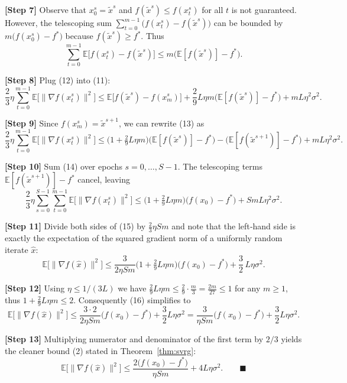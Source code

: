 \documentclass{article}
\begin{document}
\noindent\textbf{[Step 7]} Observe that $x_{0}^{s}=\tilde{x}^{s}$ and $f(\tilde{x}^{s})\le f(x_{t}^{s})$ for all $t$ is not guaranteed. However, the telescoping sum $\sum_{t=0}^{m-1}\big(f(x_{t}^{s})-f(\tilde{x}^{s})\big)$ can be bounded by $m\big(f(x_{0}^{s})-f^{*}\big)$ because $f(\tilde{x}^{s})\ge f^{*}$. Thus
\[
\sum_{t=0}^{m-1}\mathbb{E}\big[f(x_{t}^{s})-f(\tilde{x}^{s})\big]
\le m\big(\mathbb{E}[f(\tilde{x}^{s})]-f^{*}\big).
\tag{12}
\]

\noindent\textbf{[Step 8]} Plug (12) into (11):
\[
\frac{2}{3}\eta\sum_{t=0}^{m-1}\mathbb{E}\big[\|\nabla f(x_{t}^{s})\|^{2}\big]
\le \mathbb{E}\big[f(\tilde{x}^{s})-f(x_{m}^{s})\big]
   +\frac{2}{9}L\eta m\big(\mathbb{E}[f(\tilde{x}^{s})]-f^{*}\big)
   +mL\eta^{2}\sigma^{2}.
\tag{13}
\]

\noindent\textbf{[Step 9]} Since $f(x_{m}^{s})=\tilde{x}^{s+1}$, we can rewrite (13) as
\[
\frac{2}{3}\eta\sum_{t=0}^{m-1}\mathbb{E}\big[\|\nabla f(x_{t}^{s})\|^{2}\big]
\le \big(1+\tfrac{2}{9}L\eta m\big)\big(\mathbb{E}[f(\tilde{x}^{s})]-f^{*}\big)
   -\big(\mathbb{E}[f(\tilde{x}^{s+1})]-f^{*}\big)
   +mL\eta^{2}\sigma^{2}.
\tag{14}
\]

\noindent\textbf{[Step 10]} Sum (14) over epochs $s=0,\dots,S-1$. The telescoping terms $\mathbb{E}[f(\tilde{x}^{s+1})]-f^{*}$ cancel, leaving
\[
\frac{2}{3}\eta\sum_{s=0}^{S-1}\sum_{t=0}^{m-1}\mathbb{E}\big[\|\nabla f(x_{t}^{s})\|^{2}\big]
\le \big(1+\tfrac{2}{9}L\eta m\big)\big(f(x_{0})-f^{*}\big)
   +SmL\eta^{2}\sigma^{2}.
\tag{15}
\]

\noindent\textbf{[Step 11]} Divide both sides of (15) by $\frac{2}{3}\eta Sm$ and note that the left‑hand side is exactly the expectation of the squared gradient norm of a uniformly random iterate $\hat{x}$:
\[
\mathbb{E}\!\big[\|\nabla f(\hat{x})\|^{2}\big]
\le
\frac{3}{2\eta Sm}\big(1+\tfrac{2}{9}L\eta m\big)\big(f(x_{0})-f^{*}\big)
   +\frac{3}{2}\,L\eta\sigma^{2}.
\tag{16}
\]

\noindent\textbf{[Step 12]} Using $\eta\le 1/(3L)$ we have $\tfrac{2}{9}L\eta m\le \tfrac{2}{9}\cdot\frac{m}{3}= \tfrac{2m}{27}\le 1$ for any $m\ge1$, thus $1+\tfrac{2}{9}L\eta m\le2$. Consequently (16) simplifies to
\[
\mathbb{E}\!\big[\|\nabla f(\hat{x})\|^{2}\big]
\le
\frac{3\cdot2}{2\eta Sm}\big(f(x_{0})-f^{*}\big)+\frac{3}{2}L\eta\sigma^{2}
=
\frac{3}{\eta Sm}\big(f(x_{0})-f^{*}\big)+\frac{3}{2}L\eta\sigma^{2}.
\tag{17}
\]

\noindent\textbf{[Step 13]} Multiplying numerator and denominator of the first term by $2/3$ yields the cleaner bound (2) stated in Theorem~\ref{thm:svrg}:
\[
\mathbb{E}\!\big[\|\nabla f(\hat{x})\|^{2}\big]
\le
\frac{2\big(f(x_{0})-f^{*}\big)}{\eta Sm}+4L\eta\sigma^{2}.
\qquad\blacksquare
\]
\end{document}
